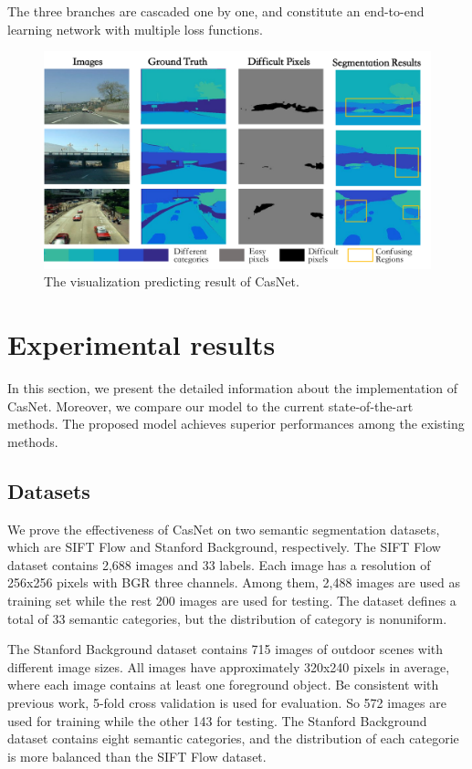 \documentclass[10.5pt,compsoc]{TsT}
\newcommand{\upcite}[1]{\superscript{\textsuperscript{\cite{#1}}}}
\theoremstyle{mystyle}
\newcommand{\upcite}[1]{\textsuperscript{\cite{#1}}}
\begin{document}
{The three branches are cascaded one by one, and constitute an end-to-end learning network with multiple loss functions.


\begin{figure}[ht]
\centering
\includegraphics[width=1.9\columnwidth]{fig3.png}
\caption{The visualization predicting result of CasNet.}
\label{fig3}
\end{figure} 

\section{Experimental results}
\label{s:results}
\noindent
In this section, we present the detailed information about the implementation of CasNet. Moreover, we compare our model to the current state-of-the-art methods. The proposed model achieves superior performances among the existing methods.

\subsection{Datasets}
\noindent
We prove the effectiveness of CasNet on two semantic segmentation datasets, which are SIFT Flow\upcite{6} and Stanford Background\upcite{7}, respectively. The SIFT Flow dataset contains 2,688 images and 33 labels. Each image has a resolution of   256x256 pixels with BGR three channels. Among them, 2,488 images are used as training set while the rest 200 images are used for testing. The dataset defines a total of 33 semantic categories, but the distribution of category is nonuniform.

The Stanford Background dataset contains 715 images of outdoor scenes with different image sizes. All images have approximately 320x240 pixels in average, where each image contains at least one foreground object. Be consistent with previous work, 5-fold cross validation is used for evaluation. So 572 images are used for training while the other 143 for testing. The Stanford Background dataset contains eight semantic categories, and the distribution of each categorie is more balanced than the SIFT Flow dataset.


}
\end{document}
